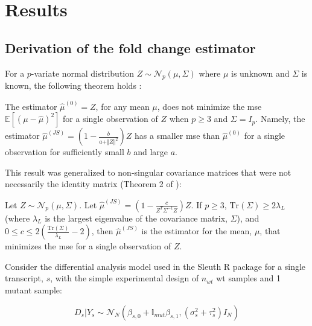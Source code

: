 \section{Results}

\subsection{Derivation of the  fold change estimator}
\label{sec:JS_derivation}

For a $p$-variate normal distribution $Z \sim \mathcal{N}_p(\mu, \Sigma)$ where $\mu$ is unknown and $\Sigma$ is known, the following theorem holds \cite{steinInadmissibilityUsualEstimator1956}:

\begin{theorem}
  The estimator $\hat{\mu}^{(0)} = Z$, for any mean $\mu$, does not minimize the \gls{mse} $\mathbb{E} \left[ (\mu - \hat{\mu})^2 \right]$ for a single observation of $Z$ when $p \ge 3$ and $\Sigma = I_p$. Namely, the estimator $\hat{\mu}^{(JS)} = \left( 1 - \frac{b}{a + \Vert Z \Vert ^2}\right) Z$ has a smaller \gls{mse} than $\hat{\mu}^{(0)}$ for a single observation for sufficiently small $b$ and large $a$.
\end{theorem}

This result was generalized to non-singular covariance matrices that were not necessarily the identity matrix (Theorem 2 of \cite[REF][]{bockMinimaxEstimatorsMean1975}):

\begin{theorem}
  Let $Z \sim \mathcal{N}_p \left(\mu, \Sigma \right)$.
  Let $\hat{\mu}^{(JS)} = \left( 1 - \frac{c}{Z^T \Sigma^{-1} Z}\right) Z$.
  If $p \ge 3$, $\text{Tr}(\Sigma) \ge 2 \lambda_L$ (where $\lambda_L$ is the largest eigenvalue of the covariance matrix, $\Sigma$), and $0 \le c \le 2 \left( \frac{\text{Tr}(\Sigma)}{\lambda_L} - 2 \right)$, then $\hat{\mu}^{(JS)}$ is the estimator for the mean, $\mu$, that minimizes the \gls{mse} for a single observation of $Z$.
\end{theorem}

Consider the differential analysis model used in the Sleuth R package \cite{pimentelDifferentialAnalysisRNAseq2017, yiGenelevelDifferentialAnalysis2018} for a single transcript, $s$, with the simple experimental design of $n_{wt}$ \gls{wt} samples and 1 mutant sample:

\begin{equation*}
  D_s | Y_s \sim \mathcal{N}_N \left( \beta_{s,0} + \mathbb{I}_{mut}\beta_{s,1}, (\sigma_s^2 + \tau_s^2)I_N \right)
\end{equation*}

